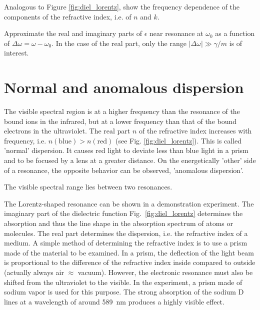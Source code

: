 \begin{questions} 
\item Analogous to Figure \ref{fig:diel_lorentz}, show the frequency dependence of the components of the refractive index, i.e. of $n$ and $k$.

\item Approximate the real and imaginary parts of $\epsilon$ near resonance at $\omega_0$ as a function of $\Delta \omega = \omega - \omega_0$. In the case of the real part, only the range $| \Delta \omega | \gg \gamma/m$ is of interest.
\end{questions}




\section{Normal and  anomalous dispersion}

The visible spectral region is at a higher frequency than the resonance of the bound ions in the infrared, but at a lower frequency than that of the bound electrons in the ultraviolet. The real part $n$ of the refractive index   increases  with frequency, i.e. $n(\text{blue}) > n(\text{red})$ (see Fig. \ref{fig:diel_lorentz}). This is called 'normal' dispersion. It causes red light to deviate less than blue light in a prism and to be focused by a lens at a greater distance. On the energetically 'other' side of a resonance, the opposite behavior can be observed, 'anomalous dispersion'.
\begin{marginfigure}
\caption{The visible spectral range lies between two resonances. \label{fig:diel_lorentz}}
\end{marginfigure}


The Lorentz-shaped resonance can be shown in a demonstration experiment. The imaginary part of the dielectric function Fig.~\ref{fig:diel_lorentz} determines the absorption and thus the line shape in the absorption spectrum of atoms or molecules. The real part determines the dispersion, i.e. the refractive index of a medium. A simple method of determining the refractive index is to use a prism made of the material to be examined. In a prism, the deflection of the light beam is proportional to the difference of the refractive index inside compared to outside (actually always air $\approx$ vacuum). However, the electronic resonance  must also be shifted from the ultraviolet to the visible. In the experiment, a prism made of sodium vapor is used for this purpose. The strong absorption of the sodium D lines at a wavelength of around 589~nm produces a highly visible effect. 



